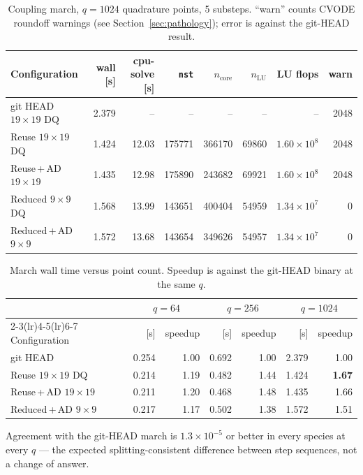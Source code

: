 \documentclass[11pt,a4paper]{article}
\newcommand{\code}[1]{\texttt{\small #1}}
\begin{document}
\begin{table}[htb]
\centering
\caption{Coupling march, $q=1024$ quadrature points, 5 substeps.
``warn'' counts CVODE roundoff warnings (see Section~\ref{sec:pathology});
error is against the git-HEAD result.}
\label{tab:phaseB}
\begin{tabular}{lrrrrrrr}
\toprule
Configuration & wall [s] & cpu-solve [s] & \code{nst} & $n_{\mathrm{core}}$
              & $n_{\mathrm{LU}}$ & LU flops & warn \\
\midrule
git HEAD $19\times19$ DQ    & 2.379 & --     & --     & --     & --    & --                 & 2048 \\
Reuse $19\times19$ DQ       & 1.424 & 12.03  & 175771 & 366170 & 69860 & $1.60\times10^{8}$ & 2048 \\
Reuse\,+\,AD $19\times19$   & 1.435 & 12.98  & 175890 & 243682 & 69921 & $1.60\times10^{8}$ & 2048 \\
Reduced $9\times9$ DQ       & 1.568 & 13.99  & 143651 & 400404 & 54959 & $1.34\times10^{7}$ & 0 \\
Reduced\,+\,AD $9\times9$   & 1.572 & 13.68  & 143654 & 349626 & 54957 & $1.34\times10^{7}$ & 0 \\
\bottomrule
\end{tabular}
\end{table}

\begin{table}[htb]
\centering
\caption{March wall time versus point count. Speedup is against the git-HEAD
binary at the same $q$.}
\label{tab:scaling}
\begin{tabular}{lrrrrrr}
\toprule
& \multicolumn{2}{c}{$q=64$} & \multicolumn{2}{c}{$q=256$}
& \multicolumn{2}{c}{$q=1024$} \\
\cmidrule(lr){2-3}\cmidrule(lr){4-5}\cmidrule(lr){6-7}
Configuration & [s] & speedup & [s] & speedup & [s] & speedup \\
\midrule
git HEAD                  & 0.254 & 1.00 & 0.692 & 1.00 & 2.379 & 1.00 \\
Reuse $19\times19$ DQ     & 0.214 & 1.19 & 0.482 & 1.44 & 1.424 & \textbf{1.67} \\
Reuse\,+\,AD $19\times19$ & 0.211 & 1.20 & 0.468 & 1.48 & 1.435 & 1.66 \\
Reduced\,+\,AD $9\times9$ & 0.217 & 1.17 & 0.502 & 1.38 & 1.572 & 1.51 \\
\bottomrule
\end{tabular}
\end{table}

Agreement with the git-HEAD march is $1.3\times10^{-5}$ or better in every
species at every $q$ --- the expected splitting-consistent difference between
step sequences, not a change of answer.
\end{document}

